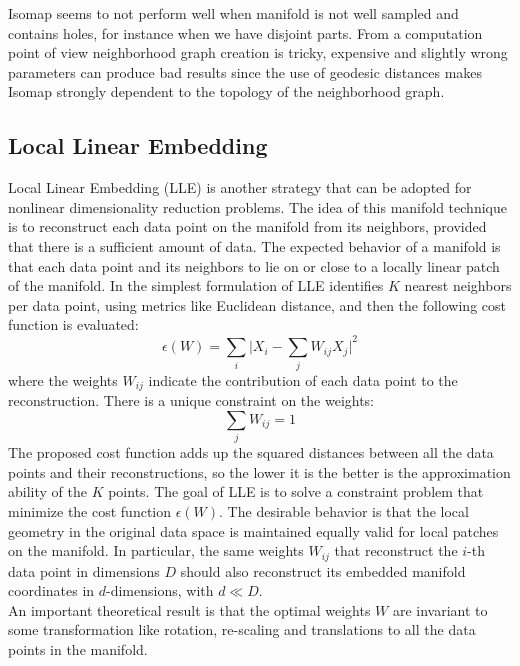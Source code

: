\documentclass[11pt,a4paper]{article}
\begin{document}
Isomap seems to not perform well when manifold is not well sampled and contains holes, for instance when we have disjoint parts. From a computation point of view neighborhood graph creation is tricky, expensive and slightly wrong parameters can produce bad results since the use of geodesic distances makes Isomap strongly dependent to the topology of the neighborhood graph.

\subsection{Local Linear Embedding}
Local Linear Embedding (LLE) is another strategy that can be adopted for nonlinear dimensionality reduction problems. The idea of this manifold technique is to reconstruct each data point on the manifold from its neighbors, provided that there is a sufficient amount of data. The expected behavior of a manifold is that each data point and its neighbors to lie on or close to a locally linear patch of the manifold. In the simplest formulation of LLE identifies $K$ nearest neighbors per data point, using metrics like Euclidean distance, and then the following cost function is evaluated:
$$ \epsilon(W) = \sum_i |{X_i - \sum_j {W_{ij}X_j}|}^2 $$
where the weights $W_{ij}$ indicate the contribution of each data point to the reconstruction. There is a unique constraint on the weights:
$$ \sum_j {W_{ij}} = 1 $$
The proposed cost function adds up the squared distances between all the data points and their reconstructions, so the lower it is the better is the approximation ability of the $K$ points. The goal of LLE is to solve a constraint problem that minimize the cost function $\epsilon(W)$.
The desirable behavior is that the local geometry in the original data space is maintained equally valid for local patches on the manifold. In particular, the same weights $W_{ij}$ that reconstruct the $i$-th data point in dimensions $D$ should also reconstruct its embedded manifold coordinates in $d$-dimensions, with $d \ll D$.\\

An important theoretical result is that the optimal weights $W$ are invariant to some transformation like rotation, re-scaling and translations to all the data points in the manifold. \\
\end{document}
